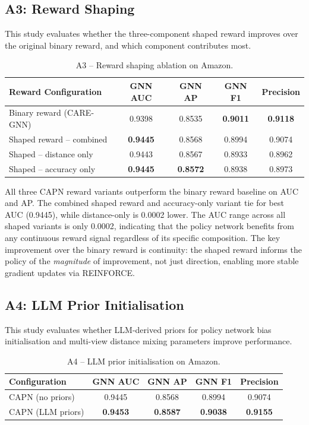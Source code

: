 \subsection{A3: Reward Shaping}

This study evaluates whether the three-component shaped reward improves over the original binary reward, and which component contributes most.

\begin{table}[h!]
\centering
\begin{tabular}{lcccc}
\toprule
\textbf{Reward Configuration} & \textbf{GNN AUC} & \textbf{GNN AP} & \textbf{GNN F1} & \textbf{Precision} \\
\midrule
Binary reward (CARE-GNN)  & 0.9398 & 0.8535 & \textbf{0.9011} & \textbf{0.9118} \\
Shaped reward -- combined & \textbf{0.9445} & 0.8568 & 0.8994 & 0.9074 \\
Shaped -- distance only   & 0.9443 & 0.8567 & 0.8933 & 0.8962 \\
Shaped -- accuracy only   & \textbf{0.9445} & \textbf{0.8572} & 0.8938 & 0.8973 \\
\bottomrule
\end{tabular}
\caption{A3 -- Reward shaping ablation on Amazon.}
\label{tab:a3-reward}
\end{table}

\noindent
All three CAPN reward variants outperform the binary reward baseline on AUC and AP. The combined shaped reward and accuracy-only variant tie for best AUC (0.9445), while distance-only is 0.0002 lower. The AUC range across all shaped variants is only 0.0002, indicating that the policy network benefits from any continuous reward signal regardless of its specific composition. The key improvement over the binary reward is continuity: the shaped reward informs the policy of the \emph{magnitude} of improvement, not just direction, enabling more stable gradient updates via REINFORCE.

\subsection{A4: LLM Prior Initialisation}

This study evaluates whether LLM-derived priors for policy network bias initialisation and multi-view distance mixing parameters improve performance.

\begin{table}[h!]
\centering
\begin{tabular}{lcccc}
\toprule
\textbf{Configuration} & \textbf{GNN AUC} & \textbf{GNN AP} & \textbf{GNN F1} & \textbf{Precision} \\
\midrule
CAPN (no priors)   & 0.9445 & 0.8568 & 0.8994 & 0.9074 \\
CAPN (LLM priors)  & \textbf{0.9453} & \textbf{0.8587} & \textbf{0.9038} & \textbf{0.9155} \\
\bottomrule
\end{tabular}
\caption{A4 -- LLM prior initialisation on Amazon.}
\label{tab:a4-llm-prior}
\end{table}

